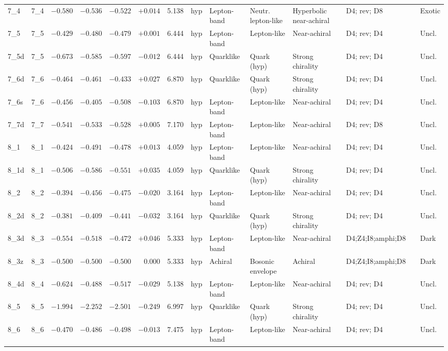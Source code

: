 \begin{landscape}
\begin{longtable}{@{}llrrrrrllp{3.2cm}lp{2.8cm}@{}}
7\_4 & 7\_4 & $-0.580$ & $-0.536$ & $-0.522$ & $+0.014$ & 5.138 & hyp & Lepton-band & Neutr. lepton-like & Hyperbolic near-achiral & D4; rev; D8 & & Exotic \\
7\_5 & 7\_5 & $-0.429$ & $-0.480$ & $-0.479$ & $+0.001$ & 6.444 & hyp & Lepton-band & Lepton-like & Near-achiral & D4; rev; D4 & & Uncl. \\
7\_5d & 7\_5 & $-0.673$ & $-0.585$ & $-0.597$ & $-0.012$ & 6.444 & hyp & Quarklike & Quark (hyp) & Strong chirality & D4; rev; D4 & & Uncl. \\
7\_6d & 7\_6 & $-0.464$ & $-0.461$ & $-0.433$ & $+0.027$ & 6.870 & hyp & Quarklike & Quark (hyp) & Strong chirality & D4; rev; D4 & & Uncl. \\
7\_6s & 7\_6 & $-0.456$ & $-0.405$ & $-0.508$ & $-0.103$ & 6.870 & hyp & Lepton-band & Lepton-like & Near-achiral & D4; rev; D4 & & Uncl. \\
7\_7d & 7\_7 & $-0.541$ & $-0.533$ & $-0.528$ & $+0.005$ & 7.170 & hyp & Lepton-band & Lepton-like & Near-achiral & D4; rev; D8 & & Uncl. \\
8\_1 & 8\_1 & $-0.424$ & $-0.491$ & $-0.478$ & $+0.013$ & 4.059 & hyp & Lepton-band & Lepton-like & Near-achiral & D4; rev; D4 & & Uncl. \\
8\_1d & 8\_1 & $-0.506$ & $-0.586$ & $-0.551$ & $+0.035$ & 4.059 & hyp & Quarklike & Quark (hyp) & Strong chirality & D4; rev; D4 & & Uncl. \\
8\_2 & 8\_2 & $-0.394$ & $-0.456$ & $-0.475$ & $-0.020$ & 3.164 & hyp & Lepton-band & Lepton-like & Near-achiral & D4; rev; D4 & & Uncl. \\
8\_2d & 8\_2 & $-0.381$ & $-0.409$ & $-0.441$ & $-0.032$ & 3.164 & hyp & Quarklike & Quark (hyp) & Strong chirality & D4; rev; D4 & & Uncl. \\
8\_3d & 8\_3 & $-0.554$ & $-0.518$ & $-0.472$ & $+0.046$ & 5.333 & hyp & Lepton-band & Lepton-like & Near-achiral & D4;Z4;I8;amphi;D8 & & Dark \\
8\_3z & 8\_3 & $-0.500$ & $-0.500$ & $-0.500$ & 0.000 & 5.333 & hyp & Achiral & Bosonic envelope & Achiral & D4;Z4;I8;amphi;D8 & & Dark \\
8\_4d & 8\_4 & $-0.624$ & $-0.488$ & $-0.517$ & $-0.029$ & 5.138 & hyp & Lepton-band & Lepton-like & Near-achiral & D4; rev; D4 & & Uncl. \\
8\_5 & 8\_5 & $-1.994$ & $-2.252$ & $-2.501$ & $-0.249$ & 6.997 & hyp & Quarklike & Quark (hyp) & Strong chirality & D4; rev; D4 & & Uncl. \\
8\_6 & 8\_6 & $-0.470$ & $-0.486$ & $-0.498$ & $-0.013$ & 7.475 & hyp & Lepton-band & Lepton-like & Near-achiral & D4; rev; D4 & & Uncl. \\

\end{longtable}
\end{landscape}
